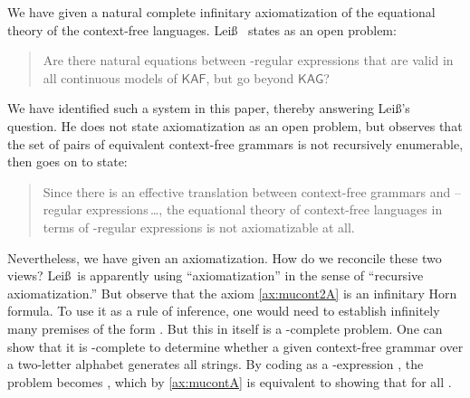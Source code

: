 \documentclass[copyright,creativecommons]{eptcs}
\theoremstyle{remark}
\newcommand\mathname[1]{\ensuremath{\mathsf{#1}}}
\newcommand\KAF{\mathname{KAF}}
\newcommand\KAG{\mathname{KAG}}
\newcommand{\fhcomment}[1]{\textcolor{red}{[\textbf{Comment (FH)}: {#1}]}}
\newcommand{\dkcomment}[1]{\textcolor{blue}{[\textbf{Comment (DK)}: {#1}]}}
\renewcommand{\fhcomment}[1]{}
\renewcommand{\dkcomment}[1]{}
\begin{document}
We have given a natural complete infinitary axiomatization of the equational theory of the context-free languages. Lei\ss\ \cite{leiss92b} states as an open problem:
\begin{quote}
Are there natural equations between -regular expressions that are valid in all
continuous models of \KAF, but go beyond \KAG?
\end{quote}
We have identified such a system in this paper, thereby answering Lei\ss's question. He does not state axiomatization as an open problem, but observes that the set of pairs of equivalent context-free grammars is not recursively enumerable, then goes on to state:
\begin{quote}
Since there is an effective translation between context-free grammars and --regular expressions\,\ldots, the equational theory of context-free languages in terms of -regular expressions is not axiomatizable at all.
\end{quote}
Nevertheless, we have given an axiomatization.
How do we reconcile these two views?
Lei\ss\ is apparently using ``axiomatization'' in the sense of ``recursive axiomatization.'' But observe that the axiom
\fhcomment{Change: Remove ``such'' since Lei\ss\ obviously uses
``axiomtization'' in the sense of ``recursive axiomatization''.  Add a statement to this effect (i.e. Lei\ss\ implicitly meaning ``recursive''.}\dkcomment{OK, how about: Nevertheless, we have given an axiomatization.
How do we reconcile these two views?
Lei\ss\ is apparently using ``axiomatization'' in the sense of ``recursive axiomatization''. But observe that the axiom...}\fhcomment{I like it. It makes clear that we are not accusing Lei\ss\ of 
making a technically wrong statement, but of not making the distinction between recursive and unrestricted axiomatization.  No need to appear to want to insult him, given he is bound to referee our paper...}\dkcomment{Unfortunately, this kind of blunts the impact of the statement. If Leiss had meant ``recursive'', he should have said it.}\fhcomment{It's pretty clear he meant it, and, yes, he should have said ``recursive''.  He is not the first one to mentally conflate ``recursive'' into ``axiomatization''.   Committing the mortal sin of 
formulating an inference rule with an undecidable side condition and calling the result an axiomatization can get one into trouble :-).}\eqref{ax:mucont2A} is an infinitary Horn formula. To use it as a rule of inference, one would need to establish infinitely many premises of the form . But this in itself is a -complete problem. One can show that it is -complete to determine whether a given context-free grammar  over a two-letter alphabet generates all strings. 
\fhcomment{Add textbook reference? E.g.~to your book?}By coding  as a -expression , the problem becomes , which by \eqref{ax:mucontA} is equivalent to showing that  for all .
\fhcomment{This is cool!}
\end{document}
